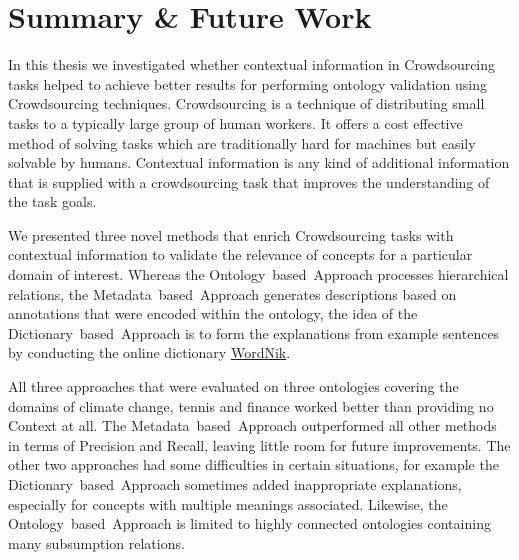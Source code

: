 
\chapter{Summary \& Future Work}\label{chap:summary_and_future_work}





In this thesis we investigated whether contextual information in Crowdsourcing tasks helped to achieve better results for performing ontology validation using Crowdsourcing techniques. Crowdsourcing is a technique of distributing small tasks to a typically large group of human workers. It offers a cost effective method of solving tasks which are traditionally hard for machines but easily solvable by humans. Contextual information is any kind of additional information that is supplied with a crowdsourcing task that improves the understanding of the task goals.

We presented three novel methods that enrich Crowdsourcing tasks with contextual information to validate the relevance of concepts for a particular domain of interest. Whereas the Ontology~based~Approach processes hierarchical relations, the Metadata~based~Approach generates descriptions based on annotations that were encoded within the ontology, the idea of the Dictionary~based~Approach is to form the explanations from example sentences by conducting the online dictionary \hyperref[sec:wordnik]{WordNik}.

All three approaches that were evaluated on three ontologies covering the domains of climate change, tennis and finance worked better than providing no Context at all. The Metadata~based~Approach outperformed all other methods in terms of Precision and Recall, leaving little room for future improvements. The other two approaches had some difficulties in certain situations, for example the Dictionary~based~Approach sometimes added inappropriate explanations, especially for concepts with multiple meanings associated. Likewise, the Ontology~based~Approach is limited to highly connected ontologies containing many subsumption relations. 

